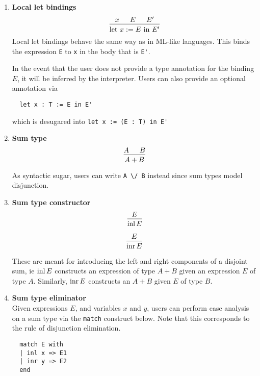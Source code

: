 \documentclass{article}
\begin{document}
\begin{enumerate}
\item \textbf{Local let bindings} \\
\[
  \begin{prooftree}
    \hypo{x}
    \hypo{E}
    \hypo{E'}
    \infer3{\text{let } x := E \text{ in } E'}
  \end{prooftree}
\]
Local let bindings behave the same way as in ML-like languages.
This binds the expression \verb|E| to \verb|x| in the body that is \verb|E'|.

In the event that the user does not provide a type annotation for the binding
$E$, it will be inferred by the interpreter. Users can also provide an optional
annotation via
\begin{verbatim}
  let x : T := E in E'
\end{verbatim}

which is desugared into \verb|let x := (E : T) in E'|

\item \textbf{Sum type} \\
\[
  \begin{prooftree}
    \hypo{A}
    \hypo{B}
    \infer2{A + B}
  \end{prooftree}
\]

As syntactic sugar, users can write \verb|A \/ B| instead since sum types
model disjunction.

\item \textbf{Sum type constructor} \\
\[
  \begin{prooftree}
    \hypo{E}
    \infer1{\inl E}
  \end{prooftree}
\]

\[
  \begin{prooftree}
    \hypo{E}
    \infer1{\inr E}
  \end{prooftree}
\]

These are meant for introducing the left and right components of a disjoint sum,
ie $\operatorname{inl} E$ constructs an expression of type $A + B$ given an expression $E$ of
type $A$. Similarly, $\operatorname{inr} E$ constructs an $A + B$ given $E$ of type $B$.

\item \textbf{Sum type eliminator} \\
Given expressions $E$, and variables $x$ and $y$, users can perform case analysis
on a sum type via the \verb|match| construct below.
Note that this corresponds to the rule of disjunction elimination.

\begin{verbatim}
  match E with
  | inl x => E1
  | inr y => E2
  end
\end{verbatim}


\end{enumerate}
\end{document}
